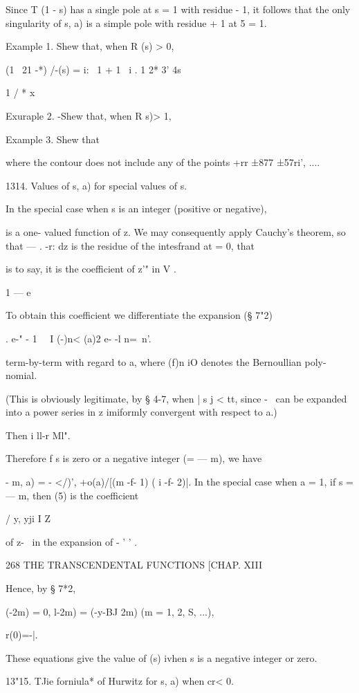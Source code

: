 Since T (1 - s) has a single pole at s = 1 with residue - 1, it
follows that the only singularity of s, a) is a simple pole with
residue + 1 at 5 = 1.

Example 1. Shew that, when R (s) > 0,

(1 \ 21 -*) /-(s) = i: \ 1 + 1 \ i . 1 2* 3' 4s ~

1 / * x ~

Exuraple 2. -Shew that, when R s)> 1,

Example 3. Shew that

where the contour does not include any of the points +rr ±877 ±57ri',
....

1314. Values of s, a) for special values of s.

In the special case when s is an integer (positive or negative),

is a one- valued function of z. We may consequently apply Cauchy's
theorem, so that — . -r: dz is the residue of the intesfrand at = 0,
that

is to say, it is the coefficient of z'" in V .

1 — e~

To obtain this coefficient we differentiate the expansion (§ 7"2)

. e-" - 1 \ \ I (-)n< (a)2 e- -l n=\ n'.

term-by-term with regard to a, where (f)n iO denotes the Bernoullian
poly- nomial.

(This is obviously legitimate, by § 4-7, when | s j < tt, since - \,
can be expanded into a power series in z imiformly convergent with
respect to a.)

Then i ll-r Ml".

Therefore f s is zero or a negative integer (= — m), we have

  - m, a) = - </)', +o(a)/[(m -f- 1) ( i -f- 2)|. In the special case
when a = 1, if s = — m, then (5) is the coefficient

/ y, yji I Z

of z-~ in the expansion of - ' ' .

268 THE TRANSCENDENTAL FUNCTIONS [CHAP. XIII

Hence, by § 7*2,

 (-2m) = 0, l-2m) = (-y-BJ 2m) (m = 1, 2, S, ...),

r(0)=-|.

These equations give the value of (s) ivhen s is a negative integer or
zero.

13"15. TJie forniula* of Hurwitz for s, a) when cr< 0.

